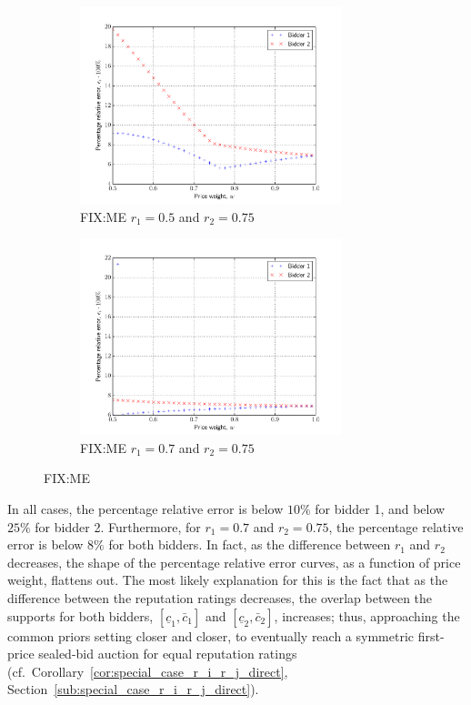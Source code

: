 \begin{figure}[p!]
\begin{subfigure}[b]{0.5\textwidth}
    \includegraphics[width=3in]{Approximation/Figures/compare_2_bidders_050_075}
    \caption{FIX:ME $r_1=0.5$ and $r_2=0.75$}
    \label{fig:compare_2_bidders_050_075_approximation}
  \end{subfigure}
  \begin{subfigure}[b]{0.5\textwidth}
    \includegraphics[width=3in]{Approximation/Figures/compare_2_bidders_070_075}
    \caption{FIX:ME $r_1=0.7$ and $r_2=0.75$}
    \label{fig:compare_2_bidders_070_075_approximation}
  \end{subfigure}
  \caption{FIX:ME}
  \label{fig:compare_2_bidders_approximation}
\end{figure}

In all cases, the percentage relative error is below $10\%$ for bidder 1, and below $25\%$ for bidder 2. Furthermore, for $r_1=0.7$ and $r_2=0.75$, the percentage relative error is below $8\%$ for both bidders. In fact, as the difference between $r_1$ and $r_2$ decreases, the shape of the percentage relative error curves, as a function of price weight, flattens out. The most likely explanation for this is the fact that as the difference between the reputation ratings decreases, the overlap between the supports for both bidders, $[\underline{c}_1, \bar{c}_1]$ and $[\underline{c}_2, \bar{c}_2]$, increases; thus, approaching the common priors setting closer and closer, to eventually reach a symmetric first-price sealed-bid auction for equal reputation ratings (cf.~Corollary~\ref{cor:special_case_r_i_r_j_direct}, Section~\ref{sub:special_case_r_i_r_j_direct}).

